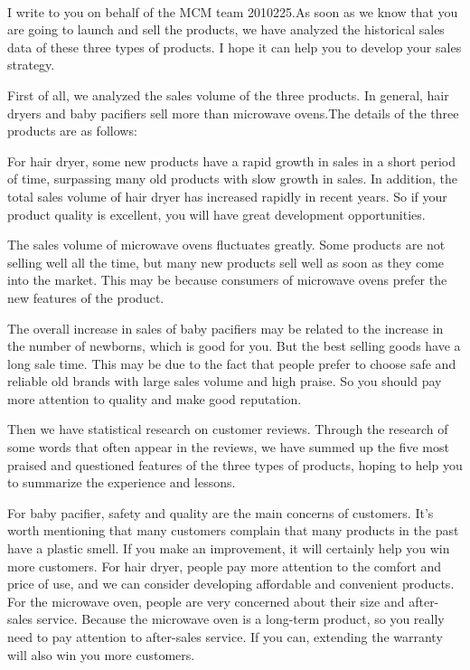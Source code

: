 \documentclass{mcmthesis}
\begin{document}
	\paragraph{}
	I write to you on behalf of the MCM team 2010225.As soon as we know that you are going to launch and sell the products, we have analyzed the historical sales data of these three types of products. I hope it can help you to develop your sales strategy.
	
	First of all, we analyzed the sales volume of the three products. 
	In general, hair dryers and baby pacifiers sell more than microwave ovens.The details of the three products are as follows:
	
	For hair dryer, some new products have a rapid growth in sales in a short period of time, surpassing many old products with slow growth in sales. In addition, the total sales volume of hair dryer has increased rapidly in recent years. So if your product quality is excellent, you will have great development opportunities. 
	
	The sales volume of microwave ovens fluctuates greatly. Some products are not selling well all the time, but many new products sell well as soon as they come into the market. This may be because consumers of microwave ovens prefer the new features of the product.
	
	The overall increase in sales of baby pacifiers may be related to the increase in the number of newborns, which is good for you. But the best selling goods have a long sale time. This may be due to the fact that people prefer to choose safe and reliable old brands with large sales volume and high praise. So you should pay more attention to quality and make good reputation.
	
	Then we have statistical research on customer reviews. Through the research of some words that often appear in the reviews, we have summed up the five most praised and questioned features of the three types of products, hoping to help you to summarize the experience and lessons.
	
	For baby pacifier, safety and quality are the main concerns of customers. It's worth mentioning that many customers complain that many products in the past have a plastic smell. If you make an improvement, it will certainly help you win more customers. For hair dryer, people pay more attention to the comfort and price of use, and we can consider developing affordable and convenient products. For the microwave oven, people are very concerned about their size and after-sales service. Because the microwave oven is a long-term product, so you really need to pay attention to after-sales service. If you can, extending the warranty will also win you more customers.
\end{document}
